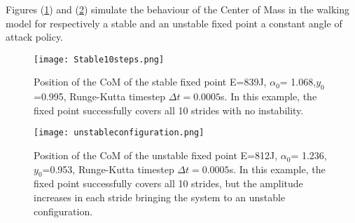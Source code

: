 Figures (\ref{estavel}) and (\ref{unstable}) simulate the behaviour of the Center of Mass in the walking model for respectively a stable and an unstable fixed point a constant angle of attack policy.
\begin{figure}[H]
  \centering
  \texttt{[image: Stable10steps.png]}
  \caption{Position of the CoM of the stable fixed point E=839J, $\alpha_0$= 1.068,$y_0$=0.995, Runge-Kutta timestep $\Delta t=0.0005$s. In this example, the fixed point successfully covers all 10 strides with no instability. }
  \label{estavel}
\end{figure}


\begin{figure}[H]
  \centering
  \texttt{[image: unstableconfiguration.png]}
  \caption{Position of the CoM of the unstable fixed point E=812J, $\alpha_0$= 1.236,$y_0$=0.953, Runge-Kutta timestep $\Delta t=0.0005$s. In this example, the fixed point successfully covers all 10 strides, but the amplitude increases in each stride bringing the system to an unstable configuration. }
  \label{unstable}
\end{figure}





